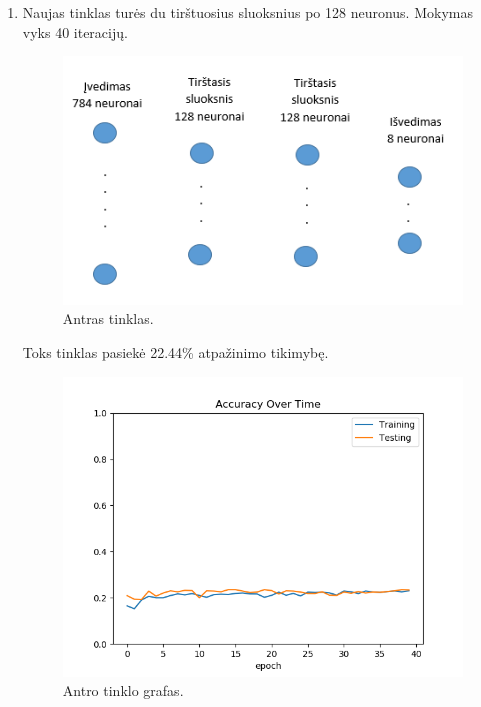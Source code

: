 \documentclass{VUMIFInfKursinis}
\begin{document}
\begin{enumerate}
    \newpage
    
    
    
    \item Naujas tinklas turės du tirštuosius sluoksnius po 128 neuronus. Mokymas vyks 40 iteracijų.
    
    \begin{figure}[h!]
    \centering
    \includegraphics[scale=0.8]{img/tinklas2}
    \caption{Antras tinklas.}
    \label{fig:tinklas2}
    \end{figure}
    
    Toks tinklas pasiekė 22.44\% atpažinimo tikimybę.
    
    \begin{figure}[h!]
    \centering
    \includegraphics[scale=0.6]{img/grafas2}
    \caption{Antro tinklo grafas.}
    \label{fig:grafas2}
    \end{figure}
    

\end{enumerate}
\end{document}
